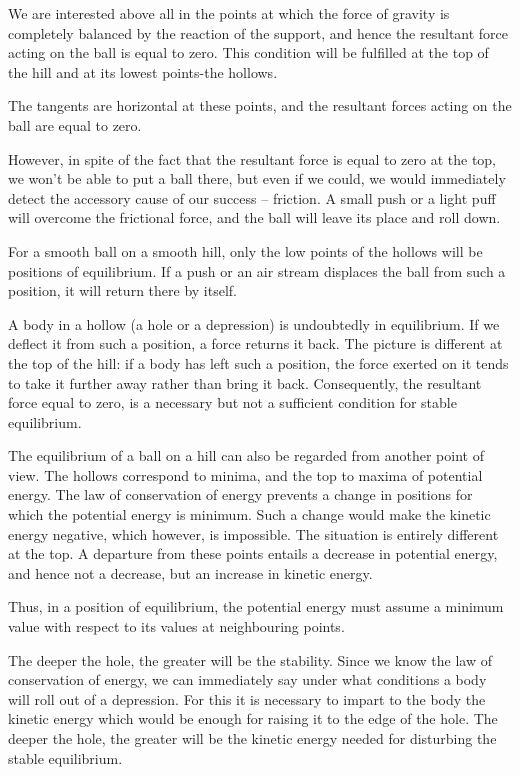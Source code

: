 We are interested above all in the points at which the
force of gravity is completely balanced by the reaction
of the support, and hence the resultant force acting on
the ball is equal to zero. This condition will be fulfilled
at the top of the hill and at its lowest points-the hollows.

The tangents are horizontal at these points, and the resultant forces acting on the ball are equal to zero.

However, in spite of the fact that the resultant force
is equal to zero at the top, we won't be able to put a ball
there, but even if we could, we would immediately detect
the accessory cause of our success -- friction. A small
push or a light puff will overcome the frictional force, and
the ball will leave its place and roll down.

For a smooth ball on a smooth hill, only the low points
of the hollows will be positions of equilibrium. If a
push or an air stream displaces the ball from such a position, it will return there by itself.

A body in a hollow (a hole or a depression) is undoubtedly in equilibrium. If we deflect it from such a position,
a force returns it back. The picture is different at the top
of the hill: if a body has left such a position, the force
exerted on it tends to take it further away rather than
bring it back. Consequently, the resultant force equal to
zero, is a necessary but not a sufficient condition for stable
equilibrium.

The equilibrium of a ball on a hill can also be regarded
from another point of view. The hollows correspond to
minima, and the top to maxima of potential energy. The
law of conservation of energy prevents a change in positions for which the potential energy is minimum. Such a change would make the kinetic energy negative, which however, is impossible. The situation is entirely different at the top. A departure from these points entails a decrease in potential energy, and hence not a decrease, but
an increase in kinetic energy.

Thus, in a position of equilibrium, the potential energy
must assume a minimum value with respect to its values
at neighbouring points.

The deeper the hole, the greater will be the stability.
Since we know the law of conservation of energy, we can
immediately say under what conditions a body will roll
out of a depression. For this it is necessary to impart to
the body the kinetic energy which would be enough for
raising it to the edge of the hole. The deeper the hole,
the greater will be the kinetic energy needed for disturbing
the stable equilibrium.

